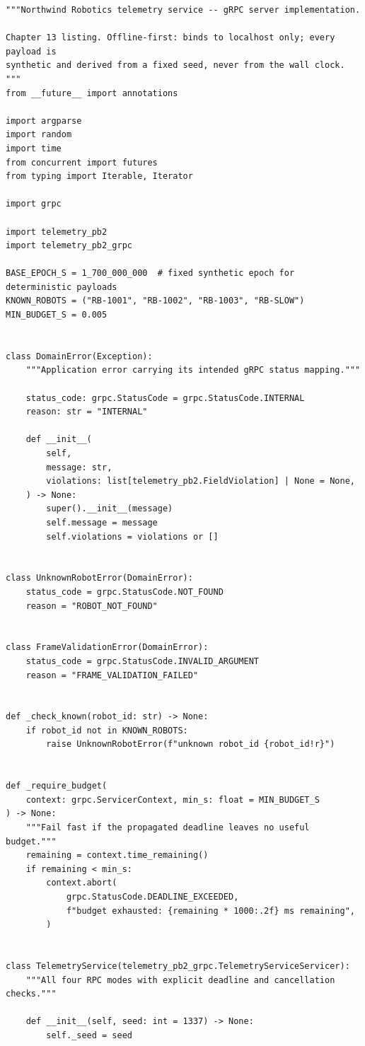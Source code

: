 \begin{verbatim}
"""Northwind Robotics telemetry service -- gRPC server implementation.

Chapter 13 listing. Offline-first: binds to localhost only; every payload is
synthetic and derived from a fixed seed, never from the wall clock.
"""
from __future__ import annotations

import argparse
import random
import time
from concurrent import futures
from typing import Iterable, Iterator

import grpc

import telemetry_pb2
import telemetry_pb2_grpc

BASE_EPOCH_S = 1_700_000_000  # fixed synthetic epoch for deterministic payloads
KNOWN_ROBOTS = ("RB-1001", "RB-1002", "RB-1003", "RB-SLOW")
MIN_BUDGET_S = 0.005


class DomainError(Exception):
    """Application error carrying its intended gRPC status mapping."""

    status_code: grpc.StatusCode = grpc.StatusCode.INTERNAL
    reason: str = "INTERNAL"

    def __init__(
        self,
        message: str,
        violations: list[telemetry_pb2.FieldViolation] | None = None,
    ) -> None:
        super().__init__(message)
        self.message = message
        self.violations = violations or []


class UnknownRobotError(DomainError):
    status_code = grpc.StatusCode.NOT_FOUND
    reason = "ROBOT_NOT_FOUND"


class FrameValidationError(DomainError):
    status_code = grpc.StatusCode.INVALID_ARGUMENT
    reason = "FRAME_VALIDATION_FAILED"


def _check_known(robot_id: str) -> None:
    if robot_id not in KNOWN_ROBOTS:
        raise UnknownRobotError(f"unknown robot_id {robot_id!r}")


def _require_budget(
    context: grpc.ServicerContext, min_s: float = MIN_BUDGET_S
) -> None:
    """Fail fast if the propagated deadline leaves no useful budget."""
    remaining = context.time_remaining()
    if remaining < min_s:
        context.abort(
            grpc.StatusCode.DEADLINE_EXCEEDED,
            f"budget exhausted: {remaining * 1000:.2f} ms remaining",
        )


class TelemetryService(telemetry_pb2_grpc.TelemetryServiceServicer):
    """All four RPC modes with explicit deadline and cancellation checks."""

    def __init__(self, seed: int = 1337) -> None:
        self._seed = seed


\end{verbatim}
